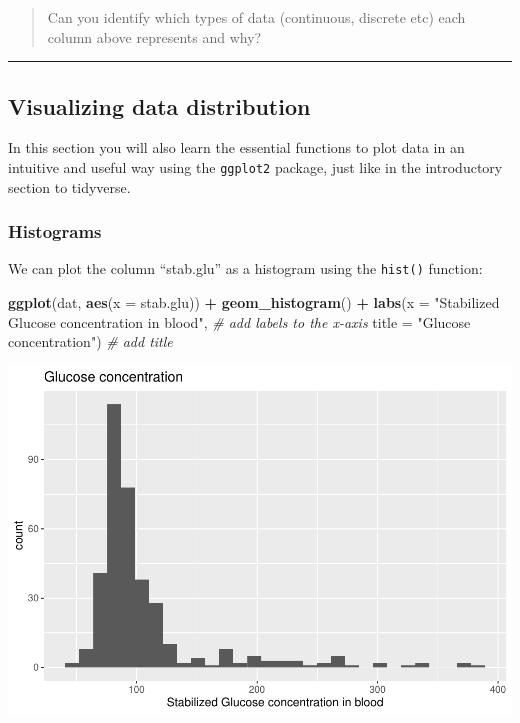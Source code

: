 \documentclass[
]{book}
\newenvironment{Shaded}{\begin{snugshade}}{\end{snugshade}}
\newcommand{\AttributeTok}[1]{\textcolor[rgb]{0.13,0.29,0.53}{#1}}
\newcommand{\CommentTok}[1]{\textcolor[rgb]{0.56,0.35,0.01}{\textit{#1}}}
\newcommand{\FunctionTok}[1]{\textcolor[rgb]{0.13,0.29,0.53}{\textbf{#1}}}
\newcommand{\NormalTok}[1]{#1}
\newcommand{\SpecialCharTok}[1]{\textcolor[rgb]{0.81,0.36,0.00}{\textbf{#1}}}
\newcommand{\StringTok}[1]{\textcolor[rgb]{0.31,0.60,0.02}{#1}}
\begin{document}
\begin{quote}
Can you identify which types of data (continuous, discrete etc) each column above represents and why?
\end{quote}

\begin{center}\rule{0.5\linewidth}{0.5pt}\end{center}

\hypertarget{visualizing-data-distribution}{%
\subsection{Visualizing data distribution}\label{visualizing-data-distribution}}

In this section you will also learn the essential functions to plot data in an intuitive and useful way using the \texttt{ggplot2} package, just like in the introductory section to tidyverse.

\hypertarget{histograms}{%
\subsubsection{Histograms}\label{histograms}}

We can plot the column ``stab.glu'' as a histogram using the \texttt{hist()} function:

\begin{Shaded}
\begin{Highlighting}[]
\FunctionTok{ggplot}\NormalTok{(dat,}
       \FunctionTok{aes}\NormalTok{(}\AttributeTok{x =}\NormalTok{ stab.glu)) }\SpecialCharTok{+}
  \FunctionTok{geom\_histogram}\NormalTok{() }\SpecialCharTok{+}
  \FunctionTok{labs}\NormalTok{(}\AttributeTok{x =} \StringTok{"Stabilized Glucose concentration in blood"}\NormalTok{,  }\CommentTok{\# add labels to the x{-}axis}
       \AttributeTok{title =} \StringTok{"Glucose concentration"}\NormalTok{)                  }\CommentTok{\# add title}
\end{Highlighting}
\end{Shaded}

\includegraphics{_main_files/figure-latex/unnamed-chunk-47-1.pdf}
\end{document}
